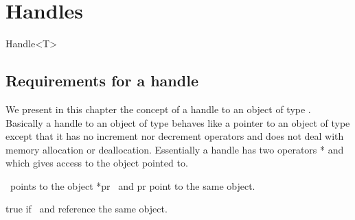 
\chapter{Handles} \label{I1_ChapterPointer}


\begin{ccClassTemplate}{Handle<T>}
\section{Requirements for a handle}

We present in this chapter the concept of a handle to an object
of type . Basically a handle to an object of type 
behaves like a pointer to an object of type  except that it has
no increment nor decrement operators and does not deal with memory
allocation or deallocation. Essentially a
 handle has two operators
* and \ccc{->} which gives  access to the object pointed to.
 


\ccTypes


\ccCreation
{}
\ccThreeToTwo

\ccGlue
{}
\ccGlue
{}

 {\ccVar\ points to the object *pr}
\ccGlue
{} {\ccVar\ and pr point
to the same object.}
\ccGlue


\ccGlue
{}




{}
{true if \ccVar\ and  reference the same object.}
\ccGlue
{}


\end{ccClassTemplate} 

